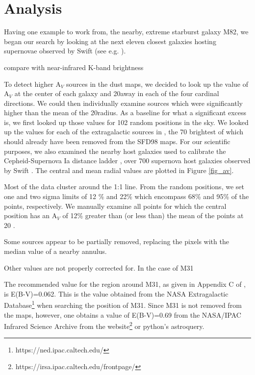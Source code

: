 \documentclass[twocolumn]{aastex61}
\begin{document}
\section{Analysis} \label{sec_analysis}
  

Having one example to work from, the nearby, extreme starburst galaxy M82, we began our search by looking at the next eleven closest galaxies hosting supernovae observed by Swift (see e.g. \citealp{Brown_etal_2015_10}).  

compare with near-infrared K-band brightness




To detect higher A$_V$ sources in the dust maps, we decided to look up the value of A$_V$ at the center of each galaxy and 20\arcmin away in each of the four cardinal directions.  We could then individually examine sources which were significantly higher than the mean of the 20\arcmin radius.  As a baseline for what a significant excess is, we first looked up those values for 102 random positions in the sky.  
We looked up the values for each of the extragalactic sources in \citet{Rice_etal_1998}, the 70 brightest of which should already have been removed from the SFD98 maps.  For our scientific purposes, we also examined the nearby host galaxies used to calibrate the Cepheid-Supernova Ia distance ladder \citep{Riess_etal_2016}, over 700 supernova host galaxies observed by Swift \citep{Brown_etal_2014_SOUSA}.  
The central and mean radial values are plotted in Figure \ref{fig_av}.  

Most of the data cluster around the 1:1 line.  From the random positions, we set one and two sigma limits of 12 \% and 22\% which encompass 68\% and 95\% of the points, respectively.  We manually examine all points for which the central position has an A$_V$ of 12\% greater than (or less than) the mean of the points at 20 \arcmin.  


Some sources appear to be partially removed, replacing the pixels with the median value of a nearby annulus.   


Other values are not properly corrected for.
In the case of M31

The recommended value for the region around M31, as given in Appendix C of \citet{Schlegel_etal_1998},  is E(B-V)=0.062.  This is the value obtained from the NASA Extragalactic Database\footnote{https://ned.ipac.caltech.edu/} when searching the position of M31.  Since M31 is not removed from the maps, however, one obtains a value of E(B-V)=0.69 from the NASA/IPAC Infrared Science Archive from the website\footnote{https://irsa.ipac.caltech.edu/frontpage/} or python's astroquery.
\end{document}

